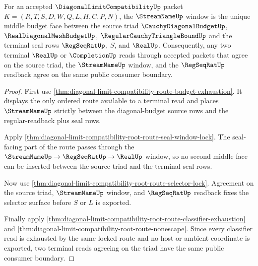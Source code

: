 \begin{theorem}
\label{thm:diagonal-limit-compatibility-streamname-budget-triad}
For an accepted $\DiagonalLimitCompatibilityUp$ packet $K=(R,T,S,D,W,Q,L,H,C,P,N)$, the $\StreamNameUp$ window is the unique middle budget face between the source triad $\CauchyDiagonalBudgetUp$, $\RealDiagonalMeshBudgetUp$, $\RegularCauchyTriangleBoundUp$ and the terminal seal rows $\RegSeqRatUp$, $S$, and $\RealUp$. Consequently, any two terminal $\RealUp$ or $\CompletionUp$ reads through accepted packets that agree on the source triad, the $\StreamNameUp$ window, and the $\RegSeqRatUp$ readback agree on the same public consumer boundary.
\end{theorem}
\begin{proof}
First use \autoref{thm:diagonal-limit-compatibility-route-budget-exhaustion}. It displays the only ordered route available to a terminal read and places $\StreamNameUp$ strictly between the diagonal-budget source rows and the regular-readback plus seal rows.

Apply \autoref{thm:diagonal-limit-compatibility-root-route-seal-window-lock}. The seal-facing part of the route passes through the $\StreamNameUp \to \RegSeqRatUp \to \RealUp$ window, so no second middle face can be inserted between the source triad and the terminal seal rows.

Now use \autoref{thm:diagonal-limit-compatibility-root-route-selector-lock}. Agreement on the source triad, $\StreamNameUp$ window, and $\RegSeqRatUp$ readback fixes the selector surface before $S$ or $L$ is exported.

Finally apply \autoref{thm:diagonal-limit-compatibility-root-route-classifier-exhaustion} and \autoref{thm:diagonal-limit-compatibility-root-route-nonescape}. Since every classifier read is exhausted by the same locked route and no host or ambient coordinate is exported, two terminal reads agreeing on the triad have the same public consumer boundary.
\end{proof}

